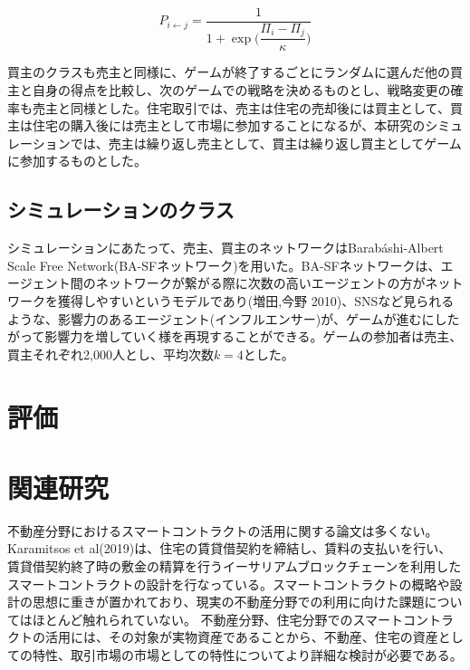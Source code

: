 \documentclass[a4paper,fontsize=11pt,report,notitlepage,line_length=38zw,number_of_lines=40,dvipdfmx]{jlreq}
\begin{document}
\begin{equation}
P_{i \gets j}=\dfrac{1}{1+\exp\biggl(\dfrac{\Pi_i-\Pi_j}{\kappa}\biggr)}
\end{equation}

買主のクラスも売主と同様に、ゲームが終了するごとにランダムに選んだ他の買主と自身の得点を比較し、次のゲームでの戦略を決めるものとし、戦略変更の確率も売主と同様とした。住宅取引では、売主は住宅の売却後には買主として、買主は住宅の購入後には売主として市場に参加することになるが、本研究のシミュレーションでは、売主は繰り返し売主として、買主は繰り返し買主としてゲームに参加するものとした。

\section{シミュレーションのクラス}
シミュレーションにあたって、売主、買主のネットワークはBarab\'{a}shi-Albert Scale Free Network(BA-SFネットワーク)を用いた。BA-SFネットワークは、エージェント間のネットワークが繋がる際に次数の高いエージェントの方がネットワークを獲得しやすいというモデルであり(増田,今野 2010)\cite{masuda2010}、SNSなど見られるような、影響力のあるエージェント(インフルエンサー)が、ゲームが進むにしたがって影響力を増していく様を再現することができる。ゲームの参加者は売主、買主それぞれ2,000人とし、平均次数$k=4$とした。

\chapter{評価}


\chapter{関連研究}
不動産分野におけるスマートコントラクトの活用に関する論文は多くない。Karamitsos et al(2019)\cite{karamitsos2019}は、住宅の賃貸借契約を締結し、賃料の支払いを行い、賃貸借契約終了時の敷金の精算を行うイーサリアムブロックチェーンを利用したスマートコントラクトの設計を行なっている。スマートコントラクトの概略や設計の思想に重きが置かれており、現実の不動産分野での利用に向けた課題についてはほとんど触れられていない。
不動産分野、住宅分野でのスマートコントラクトの活用には、その対象が実物資産であることから、不動産、住宅の資産としての特性、取引市場の市場としての特性についてより詳細な検討が必要である。
\end{document}

